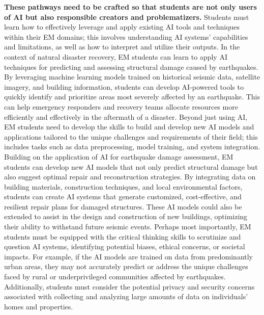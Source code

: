 \documentclass[11pt]{article}
\begin{document}
\textbf{These pathways need to be crafted so that students are not only users of AI but also responsible creators and problematizers. }
Students must learn how to effectively leverage and apply existing AI tools and techniques within their EM domains; this involves understanding AI systems' capabilities and limitations, as well as how to interpret and utilize their outputs.
In the context of natural disaster recovery, EM students can learn to apply AI techniques for predicting and assessing structural damage caused by earthquakes. By leveraging machine learning models trained on historical seismic data, satellite imagery, and building information, students can develop AI-powered tools to quickly identify and prioritize areas most severely affected by an earthquake. This can help emergency responders and recovery teams allocate resources more efficiently and effectively in the aftermath of a disaster.
Beyond just using AI, EM students need to develop the skills to build and develop new AI models and applications tailored to the unique challenges and requirements of their field; this includes tasks such as data preprocessing, model training, and system integration. 
Building on the application of AI for earthquake damage assessment, EM students can develop new AI models that not only predict structural damage but also suggest optimal repair and reconstruction strategies. By integrating data on building materials, construction techniques, and local environmental factors, students can create AI systems that generate customized, cost-effective, and resilient repair plans for damaged structures. These AI models could also be extended to assist in the design and construction of new buildings, optimizing their ability to withstand future seismic events.
Perhaps most importantly, EM students must be equipped with the critical thinking skills to scrutinize and question AI systems, identifying potential biases, ethical concerns, or societal impacts. 
For example, if the AI models are trained on data from predominantly urban areas, they may not accurately predict or address the unique challenges faced by rural or underprivileged communities affected by earthquakes. Additionally, students must consider the potential privacy and security concerns associated with collecting and analyzing large amounts of data on individuals' homes and properties.
\end{document}
